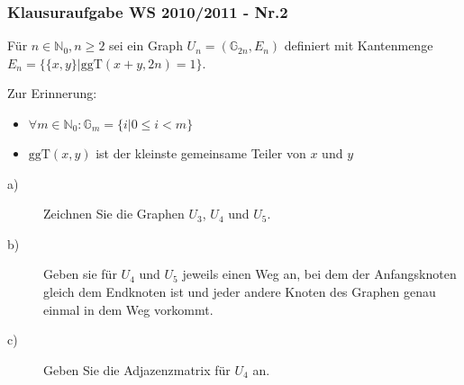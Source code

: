 \begin{frame}
	\frametitle{Klausuraufgabe WS 2010/2011 - Nr.2}
	Für $n\in \mathbb{N}_0, n \geq 2$ sei ein Graph $U_n=(\mathbb{G}_{2n},E_n)$ definiert mit Kantenmenge $E_n=\{\{x,y\}|\text{ggT}(x+y,2n)=1\}$.\\
	\vspace{.2cm}
	\begin{exampleblock}{Zur Erinnerung:}
		\begin{itemize}
			\item $\forall m\in \mathbb{N}_0: \mathbb{G}_m=\{i|0\leq i<m\}$
			\item $\text{ggT}(x,y)$ ist der kleinste gemeinsame Teiler von $x$ und $y$
		\end{itemize}
	\end{exampleblock}
	\vspace{.5cm}
	\pause
	\begin{description}
		\item[a)] Zeichnen Sie die Graphen $U_3$, $U_4$ und $U_5$.
		\item[b)] Geben sie für $U_4$ und $U_5$ jeweils einen Weg an, bei dem der Anfangsknoten gleich dem Endknoten ist und jeder andere Knoten des Graphen genau einmal in dem Weg vorkommt.
		\item[c)] Geben Sie die Adjazenzmatrix für $U_4$ an.
	\end{description}
\end{frame}

